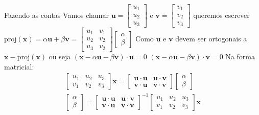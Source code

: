 \documentclass{beamer}
\begin{document}
\begin{frame}{Fazendo as contas}
  Vamos chamar $\mathbf{u} = \begin{bmatrix}
    u_1 \\ u_2 \\ u_3
  \end{bmatrix}$ e $\mathbf{v} = \begin{bmatrix}
    v_1 \\ v_2 \\ v_3
  \end{bmatrix}$ queremos escrever $\text{proj}(\mathbf{x})
=\alpha\mathbf{u} + \beta\mathbf{v} =\begin{bmatrix}
  u_1 & v_1 \\ u_2 & v_2 \\ u_3 & v_2
\end{bmatrix} \begin{bmatrix}
  \alpha \\ \beta
\end{bmatrix} $ Como $\mathbf{u}$ e $\mathbf{v}$ devem ser ortogonais
a $\mathbf{x} - \text{proj}(\mathbf{x})$ ou seja $(\mathbf{x}-\alpha\mathbf{u} -\beta\mathbf{v})\cdot\mathbf{u} =0$
$(\mathbf{x}-\alpha\mathbf{u} -\beta\mathbf{v})\cdot\mathbf{v} =0$
  Na forma matricial:
  \begin{gather*} \begin{bmatrix}
    u_1 & u_2 & u_3 \\
    v_1 & v_2 & v_3 
  \end{bmatrix} \mathbf{x} = \begin{bmatrix}
    \mathbf{u}\cdot\mathbf{u} & \mathbf{u}\cdot\mathbf{v} \\
    \mathbf{v}\cdot\mathbf{u} & \mathbf{v}\cdot\mathbf{v}
  \end{bmatrix}\begin{bmatrix}
    \alpha \\ \beta
  \end{bmatrix} \\
\begin{bmatrix}
  \alpha \\ \beta
\end{bmatrix} = \begin{bmatrix}
  \mathbf{u}\cdot\mathbf{u} & \mathbf{u}\cdot\mathbf{v} \\
  \mathbf{v}\cdot\mathbf{u} & \mathbf{v}\cdot\mathbf{v}
\end{bmatrix}^{-1} \begin{bmatrix}
  u_1 & u_2 & u_3 \\
  v_1 & v_2 & v_3 
\end{bmatrix} \mathbf{x} 
\end{gather*}
\end{frame}
\end{document}
